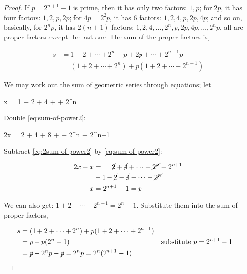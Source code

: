 \documentclass[b5paper]{article}
\begin{document}
\begin{proof}
If $p = 2^{n+1}-1$ is prime, then it has only two factors: $1, p$; for $2p$, it has four factors: $1, 2, p, 2p$; for $4p = 2^2p$, it has 6 factors: $1, 2, 4, p, 2p, 4p$; and so on, basically, for $2^n p$, it has $2(n+1)$ factors: $1, 2, 4, \dotsc, 2^n, p, 2p, 4p, \dotsc, 2^n p$, all are proper factors except the last one. The sum of the proper factors is,

\begin{align*}
s &= 1 + 2 + \dotsb + 2^n + p + 2p + \dotsb + 2^{n-1}p \\
  &= (1 + 2 + \dotsb + 2^n) + p(1 + 2 + \dotsb + 2^{n-1})
\end{align*}

We may work out the sum of geometric series through equations; let

\be
x = 1 + 2 + 4 + \dotsb + 2^n
\label{eq:sum-of-power2}
\ee

Double \cref{eq:sum-of-power2}:

\be
2x = 2 + 4 + 8 + \dotsb + 2^n + 2^{n+1}
\label{eq:2sum-of-power2}
\ee

Subtract \cref{eq:2sum-of-power2} by \cref{eq:sum-of-power2}:

\begin{align*}
2x - x & = \quad \ \cancel{2} + \cancel{4} + \dotsb + \cancel{2^n} + 2^{n+1} \\
       & - 1 - \cancel{2} - \cancel{4} - \dotsb - \cancel{2^n} \\
  x &= 2^{n+1} - 1 = p
\end{align*}

We can also get: $1 + 2 + \dotsb + 2^{n - 1} = 2^n - 1$. Substitute them into the sum of proper factors,

\begin{align*}
s &= (1 + 2 + \dotsb + 2^n) + p(1 + 2 + \dotsb + 2^{n-1}) \\
  &= p + p(2^n - 1) &&\text{substitute }p = 2^{n+1} - 1 \\
  &= \cancel{p} + 2^n p - \cancel{p} = 2^n p = 2^n (2^{n+1} - 1) && \qedhere
\end{align*}
\end{proof}
\end{document}
